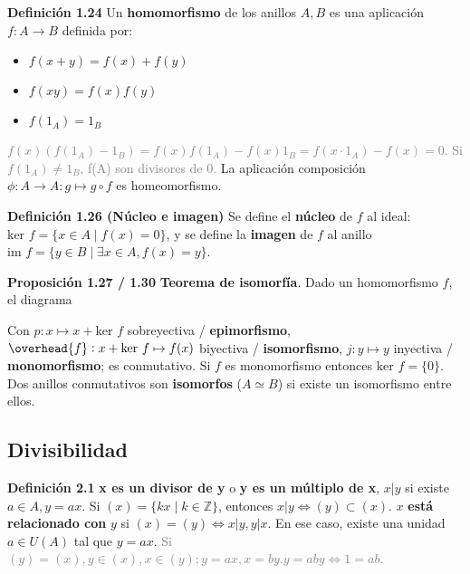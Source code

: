 \documentclass[a4paper, 11pt]{extarticle}
\newcommand{\propo}[1]{\textcolor{rojo}{\textbf{Proposición #1}}}
\newcommand{\defi}[1]{\textcolor{azul}{\textbf{Definición #1}}}
\begin{document}
\defi{1.24} Un \textbf{homomorfismo} de los anillos \(A,B\) es una aplicación \(f: A
\rightarrow B\) definida por: \vspace{-1em}
\begin{itemize}
\item \(f(x+y) = f(x) + f(y)\)
\item \(f(xy) = f(x)f(y)\)
\item \(f(1_A) = 1_B\)
\end{itemize}
\vspace{-1em}\textcolor{gray}{\footnotesize \( f(x) (f(1_A) - 1_B) = f(x)f(1_A) - f(x)1_B = f(x\cdot 1_A) - f(x) = 0 \). 
Si \( f(1_A) \neq 1_B \), f(A) son divisores de 0.}
La aplicación composición \(\phi: A \rightarrow A: g \mapsto g \circ f\) es
homeomorfismo. 

\defi{1.26 (Núcleo e imagen)} Se define el \textbf{núcleo} de \(f\) al ideal: \(\text{ker } f
= \{ x \in A \;|\; f(x) = 0 \}\), y se define la \textbf{imagen} de \(f\) al anillo \(\text{im } f = \{ y \in B \;|\; \exists x \in A, f(x) = y \}\).

\propo{1.27 / 1.30} \textbf{Teorema de isomorfía}. Dado un homomorfismo \(f\), el diagrama

\vspace{-1em}
\begin{center}
\end{center}
\vspace{-1em}
Con \(p: x \mapsto x + \text{ker }f\) sobreyectiva / \textbf{epimorfismo}, \(\overhead{f}: x +
\text{ker }f \mapsto f(x)\) biyectiva / \textbf{isomorfismo}, \(j: y \mapsto y\)
inyectiva / \textbf{monomorfismo}; es
conmutativo.  
Si \(f\) es monomorfismo entonces \(\text{ker }f = \{ 0 \}\). Dos anillos
conmutativos son \textbf{isomorfos} (\(A \simeq B\)) si existe un isomorfismo entre
ellos.

\subsection*{Divisibilidad}
\label{sec:orgfdac41d}
\vspace{-1em}
\defi{2.1} \textbf{x es un divisor de y} o \textbf{y es un múltiplo de x}, \(x | y\) si existe
\(a \in A, y = ax\). Si \((x) = \{ kx \;|\; k \in \mathbb{Z} \}\), entonces
\(x|y \iff (y) \subset (x)\). \(x\) \textbf{está relacionado con} \(y\) si \((x) =
(y) \iff x|y, y|x\). En ese caso, existe una unidad \(a \in U(A)\) tal que \(y = ax\).
\vspace{-1em}\textcolor{gray}{\footnotesize Si \( (y) = (x), y \in(x), x \in(y); y = ax, x = by. y = aby \iff 1 = ab \).}
\end{document}
